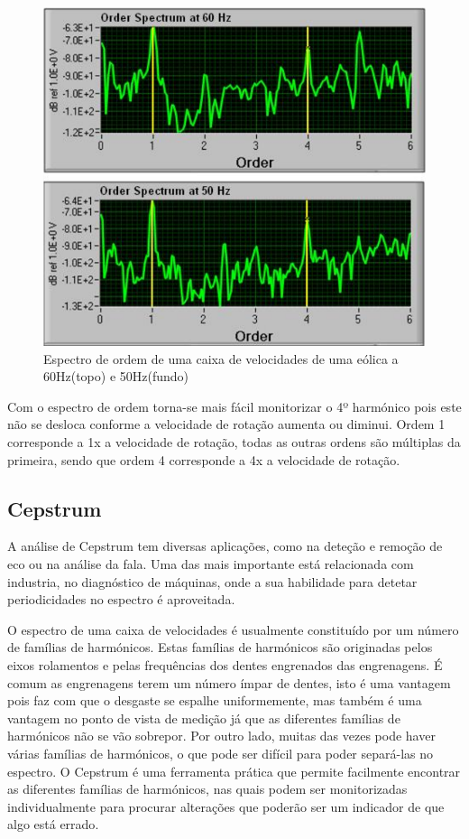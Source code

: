 \begin{figure}[H]
\centering
\includegraphics[scale=0.3]{figs/order_spectrum}
\caption{Espectro de ordem de uma caixa de velocidades de uma eólica a 60Hz(topo) e 50Hz(fundo)}\label{power espectrum 3}
\end{figure}


Com o espectro de ordem torna-se mais fácil monitorizar o 4º harmónico pois este não se desloca conforme a velocidade de rotação aumenta ou diminui. Ordem 1 corresponde a 1x a velocidade de rotação, todas as outras ordens são múltiplas da primeira, sendo que ordem 4 corresponde a 4x a velocidade de rotação.

\subsection{Cepstrum}

A análise de Cepstrum tem diversas aplicações, como na deteção e remoção de eco ou na análise da fala. Uma das mais importante está relacionada com industria, no diagnóstico de máquinas, onde a sua habilidade para detetar periodicidades no espectro é aproveitada.

O espectro de uma caixa de velocidades é usualmente constituído por um número de famílias de harmónicos. Estas famílias de harmónicos são originadas pelos eixos rolamentos e pelas frequências dos dentes engrenados das engrenagens. É comum as engrenagens terem um número ímpar de dentes, isto é uma vantagem pois faz com que o desgaste se espalhe uniformemente, mas também é uma vantagem no ponto de vista de medição já que as diferentes famílias de harmónicos não se vão sobrepor. Por outro lado, muitas das vezes pode haver várias famílias de harmónicos, o que pode ser difícil para poder separá-las no espectro. O Cepstrum é uma ferramenta prática que permite facilmente encontrar as diferentes famílias de harmónicos, nas quais podem ser monitorizadas individualmente para procurar alterações que poderão ser um indicador de que algo está errado\cite{Notes2}.

